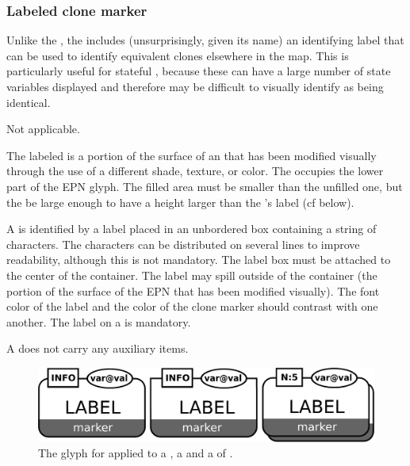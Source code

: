 \subsubsection{Labeled clone marker}

Unlike the , the  includes (unsurprisingly, given its name) an identifying label that can be used to identify equivalent clones elsewhere in the map.  This is particularly useful for stateful , because these can have a large number of state variables displayed and therefore may be difficult to visually identify as being identical.

\begin{glyphDescription}

\glyphSboTerm Not applicable.

\glyphContainer The labeled  is a portion of the surface of an  that has been modified visually through the use of a different shade, texture, or color.  The  occupies the lower part of the EPN glyph. The filled area must be smaller than the unfilled one, but the be large enough to have a height larger than the 's label (cf below).  

\glyphLabel A  is identified by a label placed in an unbordered box containing a string of characters.  The characters can be distributed on several lines to improve readability, although this is not mandatory.  The label box must be attached to the center of the container.  The label may spill outside of the container (the portion of the surface of the EPN that has been modified visually).  The font color of the label and the color of the clone marker should contrast with one another.  The label on a  is mandatory.

\glyphAux A  does not carry any auxiliary items.

\end{glyphDescription}

\begin{figure}[H]
  \centering
  \includegraphics[scale = 0.3]{images/labeledCloneMarker}
  \caption{The \PD glyph for  applied to a , a  and a  of .}
  \label{fig:labeledCloneMarker}
\end{figure}

